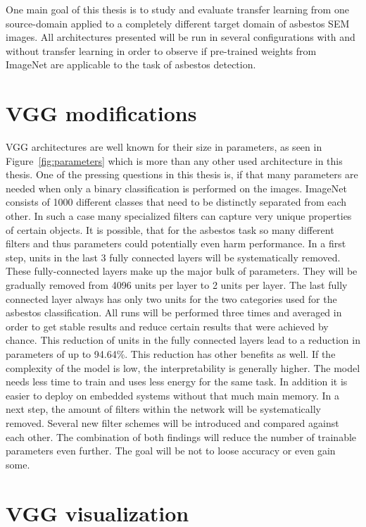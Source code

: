 One main goal of this thesis is to study and evaluate transfer learning from one source-domain applied to a completely different target domain of asbestos SEM images. All architectures presented will be run in several configurations with and without transfer learning in order to observe if pre-trained weights from ImageNet are applicable to the task of asbestos detection.

\section{VGG modifications}

VGG architectures are well known for their size in parameters, as seen in Figure~\ref{fig:parameters} which is more than any other used architecture in this thesis. One of the pressing questions in this thesis is, if that many parameters are needed when only a binary classification is performed on the images. ImageNet consists of 1000 different classes that need to be distinctly separated from each other. In such a case many specialized filters can capture very unique properties of certain objects. It is possible, that for the asbestos task so many different filters and thus parameters could  potentially even harm performance. In a first step, units in the last 3 fully connected layers will be systematically removed. These fully-connected layers make up the major bulk of parameters. They will be gradually removed from 4096 units per layer to 2 units per layer. The last fully connected layer always has only two units for the two categories used for the asbestos classification. All runs will be performed  three times  and averaged in order to get stable results and reduce certain results that were achieved by chance.  This reduction of units in the fully connected layers lead to a reduction in parameters of up to 94.64\%. This reduction has other benefits as well. If the complexity of the model is low, the interpretability is generally higher. The model needs less time to train and uses less energy for the same task.  In addition it is easier to deploy on embedded systems without that much main memory. In a next step, the amount of filters within the network will be systematically removed. Several new filter schemes will be introduced and compared against each other. The combination of both findings will reduce the number of trainable parameters even further. The goal will be not to loose accuracy or even gain some.\\

\section{VGG visualization}

